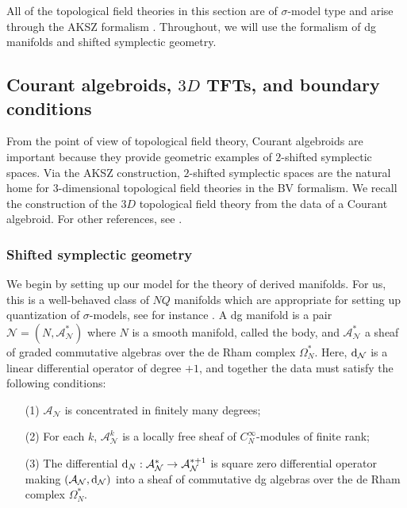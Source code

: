 \documentclass{article}
\newcommand{\cN}{\mathcal{N}}
\def\sA{\mathcal{A}}
\def\d{{\rm d}}
\theoremstyle{definition}
\theoremstyle{remark}
\def\brian{\textcolor{blue}{BM: }\textcolor{blue}}
\begin{document}
All of the topological field theories in this section are of $\sigma$-model type and arise through the AKSZ formalism \cite{AKSZ}. 
Throughout, we will use the formalism of dg manifolds and shifted symplectic geometry. 

\subsection{Courant algebroids, $3D$ TFTs, and boundary conditions}


From the point of view of topological field theory, Courant algebroids are important because they provide geometric examples of $2$-shifted symplectic spaces. 
Via the AKSZ construction, $2$-shifted symplectic spaces are the natural home for $3$-dimensional topological field theories in the BV formalism. 
We recall the construction of the $3D$ topological field theory from the data of a Courant algebroid. 
For other references, see \cite{Roytenberg:2002nu, Cattaneo:2009zx}. 

\subsubsection{Shifted symplectic geometry} 
\label{sec: dgman}

We begin by setting up our model for the theory of derived manifolds. 
For us, this is a well-behaved class of $NQ$ manifolds which are appropriate for setting up quantization of $\sigma$-models, see for instance \cite{CostelloSUSY}. 
A dg manifold is a pair $\cN = (N, \sA^*_\cN)$ where $N$ is a smooth manifold, called the body, and $\sA^*_\cN$ a sheaf of graded commutative algebras over the de Rham complex $\Omega^*_N$.
Here, $\d_\cN$ is a linear differential operator of degree $+1$, and together the data must satisfy the following conditions:
\begin{itemize}
\item[(1)] $\sA_\cN$ is concentrated in finitely many degrees;
\item[(2)] For each $k$, $\sA^k_\cN$ is a locally free sheaf of $C^\infty_N$-modules of finite rank;
\item[(3)] The differential $\d_N : \sA_\cN^* \to \sA_\cN^{*+1}$ is square zero differential operator making $(\sA_\cN , \d_\cN)$ into a sheaf of commutative dg algebras over the de Rham complex $\Omega^*_N$.
\end{itemize}
\end{document}
